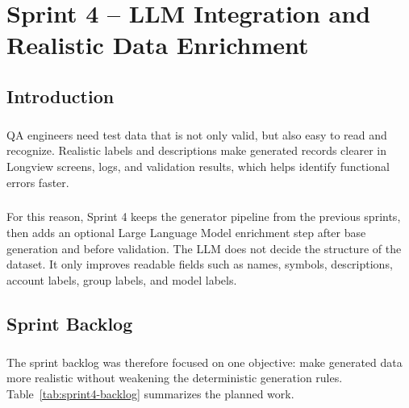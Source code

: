 \chapter{Sprint 4 -- LLM Integration and Realistic Data Enrichment}

\setlength{\textfloatsep}{8pt plus 2pt minus 2pt}
\setlength{\floatsep}{8pt plus 2pt minus 2pt}
\setlength{\intextsep}{8pt plus 2pt minus 2pt}
\setlength{\abovecaptionskip}{4pt}
\setlength{\belowcaptionskip}{0pt}

\section*{Introduction}

\paragraph{}QA engineers need test data that is not only valid, but also easy to read and recognize.
Realistic labels and descriptions make generated records clearer in Longview screens, logs, and
validation results, which helps identify functional errors faster.

\paragraph{}For this reason, Sprint 4 keeps the generator pipeline from the previous sprints, then adds
an optional Large Language Model enrichment step after base generation and before validation. The LLM
does not decide the structure of the dataset. It only improves readable fields such as names,
symbols, descriptions, account labels, group labels, and model labels.

\section{Sprint Backlog}

\paragraph{}The sprint backlog was therefore focused on one objective: make generated data more
realistic without weakening the deterministic generation rules. Table~\ref{tab:sprint4-backlog}
summarizes the planned work.

